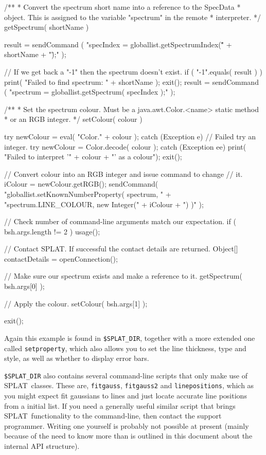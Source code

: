 \documentclass[twoside,11pt,nolof]{starlink}
\providecommand{\SPLAT}{\textsf{SPLAT}}
\providecommand{\hitext}[1]{\texttt{#1}}
\begin{document}
\begin{terminalv}
/**
 * Convert the spectrum short name into a reference to the SpecData
 * object. This is assigned to the variable "spectrum" in the remote
 * interpreter.
 */
getSpectrum( shortName )
{
    result = sendCommand
        ( "specIndex = globallist.getSpectrumIndex(\"" + shortName + "\");" );

    //  If we get back a "-1" then the spectrum doesn't exist.
    if ( "-1".equals( result ) ) {
        print( "Failed to find spectrum: " + shortName );
        exit();
    }
    result = sendCommand
        ( "spectrum = globallist.getSpectrum( specIndex );" );
}

/**
 * Set the spectrum colour. Must be a java.awt.Color.<name> static method
 * or an RGB integer.
 */
setColour( colour )
{
    try {
        newColour = eval( "Color." + colour );
    }
    catch (Exception e) {
        //  Failed try an integer.
        try {
            newColour = Color.decode( colour );
        }
        catch (Exception ee) {
            print( "Failed to interpret '" + colour + "' as a colour");
            exit();
        }
    }

    //  Convert colour into an RGB integer and issue command to change
    //  it.
    iColour = newColour.getRGB();
    sendCommand( "globallist.setKnownNumberProperty( spectrum, " +
                 "spectrum.LINE_COLOUR, new Integer(" + iColour + ") )" );

}

//  Check number of command-line arguments match our expectation.
if ( bsh.args.length != 2 ) {
   usage();
}

//  Contact SPLAT. If successful the contact details are returned.
Object[] contactDetails = openConnection();

//  Make sure our spectrum exists and make a reference to it.
getSpectrum( bsh.args[0] );

//  Apply the colour.
setColour( bsh.args[1] );

exit();
\end{terminalv}

Again this example is found in \hitext{\$SPLAT\_DIR}, together with a
more extended one called \hitext{setproperty}, which also allows you
to set the line thickness, type and style, as well as whether to
display error bars.

\hitext{\$SPLAT\_DIR} also contains several command-line scripts that
only make use of \SPLAT\ classes. These are, \hitext{fitgauss},
\hitext{fitgauss2} and \hitext{linepositions}, which as you might
expect fit gaussians to lines and just locate accurate line positions
from a initial list. If you need a generally useful similar script
that brings \SPLAT\ functionality to the command-line, then contact
the support programmer. Writing one yourself is probably not possible
at present (mainly because of the need to know more than is outlined
in this document about the internal API structure).
\end{document}
